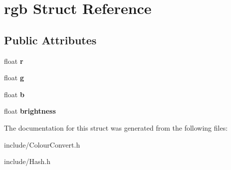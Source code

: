 \hypertarget{structrgb}{}\section{rgb Struct Reference}
\label{structrgb}
\subsection*{Public Attributes}
\begin{DoxyCompactItemize}
\item 
float {\bfseries r}\hypertarget{structrgb_a417987de6545982be6012a0c8ba517c6}{}\label{structrgb_a417987de6545982be6012a0c8ba517c6}

\item 
float {\bfseries g}\hypertarget{structrgb_a8ebc8e4a87db5d5dda3980b88fe31f35}{}\label{structrgb_a8ebc8e4a87db5d5dda3980b88fe31f35}

\item 
float {\bfseries b}\hypertarget{structrgb_ac2be2182f82e2c3c99860a560b19ec57}{}\label{structrgb_ac2be2182f82e2c3c99860a560b19ec57}

\item 
float {\bfseries brightness}\hypertarget{structrgb_a7ce9332d007827250f0c693403dc95e0}{}\label{structrgb_a7ce9332d007827250f0c693403dc95e0}

\end{DoxyCompactItemize}


The documentation for this struct was generated from the following files\+:\begin{DoxyCompactItemize}
\item 
include/Colour\+Convert.\+h\item 
include/Hash.\+h\end{DoxyCompactItemize}
